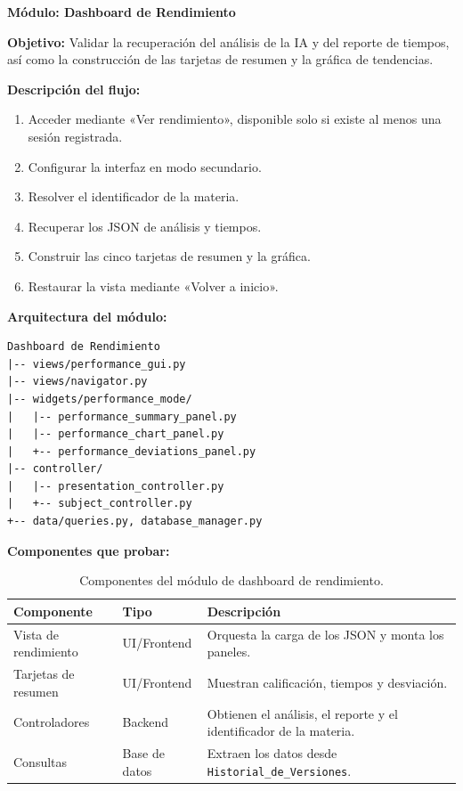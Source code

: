 \documentclass[12pt,letterpaper]{article}
\begin{document}
\clearpage
\textbf{Módulo: Dashboard de Rendimiento}

\textbf{Objetivo:} Validar la recuperación del análisis de la IA y del reporte de tiempos, así como la construcción de las tarjetas de resumen y la gráfica de tendencias.

\textbf{Descripción del flujo:}
\begin{enumerate}
\item Acceder mediante «Ver rendimiento», disponible solo si existe al menos una sesión registrada.
\item Configurar la interfaz en modo secundario.
\item Resolver el identificador de la materia.
\item Recuperar los JSON de análisis y tiempos.
\item Construir las cinco tarjetas de resumen y la gráfica.
\item Restaurar la vista mediante «Volver a inicio».
\end{enumerate}

\textbf{Arquitectura del módulo:}
\begin{verbatim}
Dashboard de Rendimiento
|-- views/performance_gui.py
|-- views/navigator.py
|-- widgets/performance_mode/
|   |-- performance_summary_panel.py
|   |-- performance_chart_panel.py
|   +-- performance_deviations_panel.py
|-- controller/
|   |-- presentation_controller.py
|   +-- subject_controller.py
+-- data/queries.py, database_manager.py
\end{verbatim}

\textbf{Componentes que probar:}
\begin{table}[H]
\centering
\begin{tabular}{|L{0.34\textwidth}|L{0.18\textwidth}|L{0.38\textwidth}|}
\hline
\textbf{Componente} & \textbf{Tipo} & \textbf{Descripción} \\ \hline
Vista de rendimiento & UI/Frontend & Orquesta la carga de los JSON y monta los paneles. \\ \hline
Tarjetas de resumen & UI/Frontend & Muestran calificación, tiempos y desviación. \\ \hline
Controladores & Backend & Obtienen el análisis, el reporte y el identificador de la materia. \\ \hline
Consultas & Base de datos & Extraen los datos desde \texttt{Historial\_de\_Versiones}. \\ \hline
\end{tabular}
\caption{Componentes del módulo de dashboard de rendimiento.}
\label{tab:componentes-modulo-dashboard}
\end{table}
\end{document}
